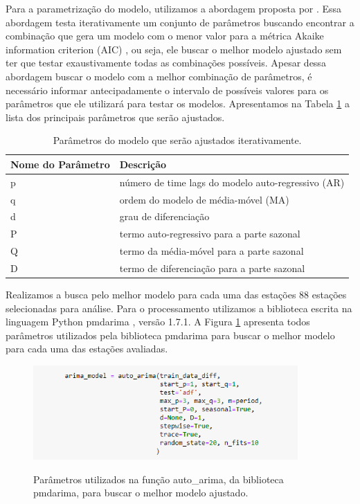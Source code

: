 Para a parametrização do modelo, utilizamos a abordagem proposta por \cite{hyndman2007automatic}. Essa abordagem testa iterativamente um conjunto de parâmetros buscando encontrar a combinação que gera um modelo com o menor valor para a métrica Akaike information criterion (AIC) \cite{sakamoto1986akaike}, ou seja, ele buscar o melhor modelo ajustado sem ter que testar exaustivamente todas as combinações possíveis. Apesar dessa abordagem buscar o modelo com a melhor combinação de parâmetros, é necessário informar antecipadamente o intervalo de possíveis valores para os parâmetros que ele utilizará para testar os modelos. Apresentamos na Tabela \ref{tab:lista_parametros_arima} a lista dos principais parâmetros que serão ajustados.

\begin{table}[H]
\caption{Parâmetros do modelo que serão ajustados iterativamente.}
\label{tab:lista_parametros_arima}
\begin{adjustbox}{width=\textwidth}
\begin{tabular}{|l|l|}
\hline
\textbf{Nome do Parâmetro} & \textbf{Descrição}\\
\hline
p  & número de time lags do modelo auto-regressivo (AR) \\
\hline
q & ordem do modelo de média-móvel (MA) \\
\hline
d & grau de diferenciação \\
\hline
P & termo auto-regressivo para a parte sazonal \\
\hline
Q & termo da média-móvel para a parte sazonal \\
\hline
D & termo de diferenciação para a parte sazonal \\
\hline
\end{tabular}
\end{adjustbox}
\end{table}

Realizamos a busca pelo melhor modelo para cada uma das estações 88 estações selecionadas para análise. Para o processamento utilizamos a biblioteca escrita na linguagem Python pmdarima \cite{smith2017pmdarima}, versão 1.7.1. A Figura \ref{fig:parametros_auto_arima} apresenta todos parâmetros utilizados pela biblioteca pmdarima para buscar o melhor modelo para cada uma das estações avaliadas. 

\begin{figure}[H]
\centering
\caption{Parâmetros utilizados na função auto\_arima, da biblioteca pmdarima, para buscar o melhor modelo ajustado.}
\includegraphics[width=0.9\textwidth]{figuras/parametros_autoarima.png}
\label{fig:parametros_auto_arima}
\end{figure}

